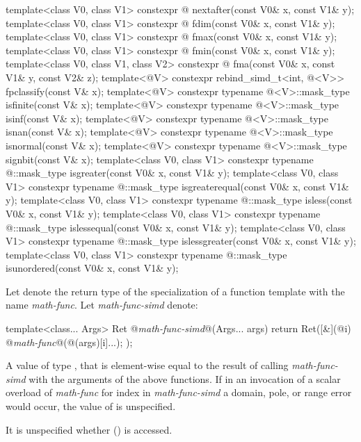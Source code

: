 \begin{itemdecl}
template<class V0, class V1>
  constexpr @ nextafter(const V0& x, const V1& y);
template<class V0, class V1>
  constexpr @ fdim(const V0& x, const V1& y);
template<class V0, class V1>
  constexpr @ fmax(const V0& x, const V1& y);
template<class V0, class V1>
  constexpr @ fmin(const V0& x, const V1& y);
template<class V0, class V1, class V2>
  constexpr @ fma(const V0& x, const V1& y, const V2& z);
template<@\mathfloatingpoint@ V> constexpr rebind_simd_t<int, @\deducedsimd@<V>> fpclassify(const V& x);
template<@\mathfloatingpoint@ V> constexpr typename @\deducedsimd@<V>::mask_type isfinite(const V& x);
template<@\mathfloatingpoint@ V> constexpr typename @\deducedsimd@<V>::mask_type isinf(const V& x);
template<@\mathfloatingpoint@ V> constexpr typename @\deducedsimd@<V>::mask_type isnan(const V& x);
template<@\mathfloatingpoint@ V> constexpr typename @\deducedsimd@<V>::mask_type isnormal(const V& x);
template<@\mathfloatingpoint@ V> constexpr typename @\deducedsimd@<V>::mask_type signbit(const V& x);
template<class V0, class V1>
  constexpr typename @::mask_type isgreater(const V0& x, const V1& y);
template<class V0, class V1>
  constexpr typename @::mask_type isgreaterequal(const V0& x, const V1& y);
template<class V0, class V1>
  constexpr typename @::mask_type isless(const V0& x, const V1& y);
template<class V0, class V1>
  constexpr typename @::mask_type islessequal(const V0& x, const V1& y);
template<class V0, class V1>
  constexpr typename @::mask_type islessgreater(const V0& x, const V1& y);
template<class V0, class V1>
  constexpr typename @::mask_type isunordered(const V0& x, const V1& y);
\end{itemdecl}
\begin{itemdescr}
  \pnum
  Let  denote the return type of the specialization of a function template with the name
  \textit{math-func}.
  Let \textit{math-func-simd} denote:
  \begin{codeblock}
template<class... Args>
Ret @\textit{math-func-simd}@(Args... args) {
  return Ret([&](@\simdsizetype@ i) {
      @\textit{math-func}@(@(args)[i]...);
  });
}
  \end{codeblock}

  \pnum\returns
  A value  of type , that is element-wise equal to the result of calling
  \textit{math-func-simd} with the arguments of the above functions.
  If in an invocation of a scalar overload of \textit{math-func} for index  in
  \textit{math-func-simd} a domain, pole, or range error would occur, the value of  is
  unspecified.

  \pnum\remarks
  It is unspecified whether  () is accessed.
\end{itemdescr}


